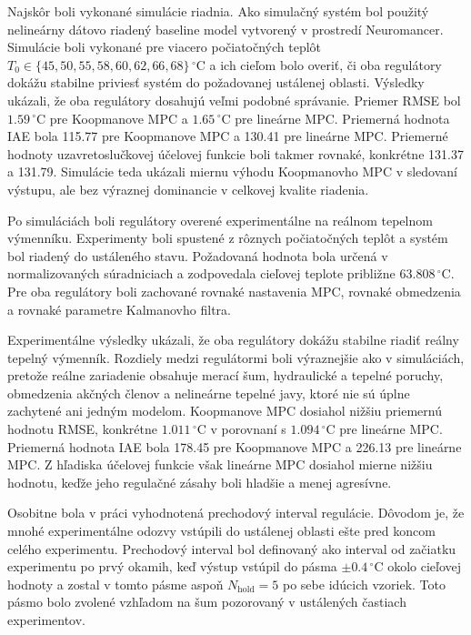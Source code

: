 Najskôr boli vykonané simulácie riadnia. Ako simulačný systém bol použitý nelineárny dátovo riadený baseline model vytvorený v prostredí Neuromancer. Simulácie boli vykonané pre viacero počiatočných teplôt $T_0 \in \{45,50,55,58,60,62,66,68\}\,^\circ\mathrm{C}$ a ich cieľom bolo overiť, či oba regulátory dokážu stabilne priviesť systém do požadovanej ustálenej oblasti. Výsledky ukázali, že oba regulátory dosahujú veľmi podobné správanie. Priemer RMSE bol $1.59\,^\circ\mathrm{C}$ pre Koopmanove MPC a $1.65\,^\circ\mathrm{C}$ pre lineárne MPC. Priemerná hodnota IAE bola 115.77 pre Koopmanove MPC a 130.41 pre lineárne MPC. Priemerné hodnoty uzavretoslučkovej účelovej funkcie boli takmer rovnaké, konkrétne 131.37 a 131.79. Simulácie teda ukázali miernu výhodu Koopmanovho MPC v sledovaní výstupu, ale bez výraznej dominancie v celkovej kvalite riadenia.

Po simuláciách boli regulátory overené experimentálne na reálnom tepelnom výmenníku. Experimenty boli spustené z rôznych počiatočných teplôt a systém bol riadený do ustáleného stavu. Požadovaná hodnota bola určená v normalizovaných súradniciach a zodpovedala cieľovej teplote približne $63.808\,^\circ\mathrm{C}$. Pre oba regulátory boli zachované rovnaké nastavenia MPC, rovnaké obmedzenia a rovnaké parametre Kalmanovho filtra.

Experimentálne výsledky ukázali, že oba regulátory dokážu stabilne riadiť reálny tepelný výmenník. Rozdiely medzi regulátormi boli výraznejšie ako v simuláciách, pretože reálne zariadenie obsahuje merací šum, hydraulické a tepelné poruchy, obmedzenia akčných členov a nelineárne tepelné javy, ktoré nie sú úplne zachytené ani jedným modelom. Koopmanove MPC dosiahol nižšiu priemernú hodnotu RMSE, konkrétne $1.011\,^\circ\mathrm{C}$ v porovnaní s $1.094\,^\circ\mathrm{C}$ pre lineárne MPC. Priemerná hodnota IAE bola 178.45 pre Koopmanove MPC a 226.13 pre lineárne MPC. Z hľadiska účelovej funkcie však lineárne MPC dosiahol mierne nižšiu hodnotu, keďže jeho regulačné zásahy boli hladšie a menej agresívne.

Osobitne bola v práci vyhodnotená prechodový interval regulácie. Dôvodom je, že mnohé experimentálne odozvy vstúpili do ustálenej oblasti ešte pred koncom celého experimentu. Prechodový interval bol definovaný ako interval od začiatku experimentu po prvý okamih, keď výstup vstúpil do pásma $\pm 0.4\,^\circ\mathrm{C}$ okolo cieľovej hodnoty a zostal v tomto pásme aspoň $N_{\mathrm{hold}} = 5$ po sebe idúcich vzoriek. Toto pásmo bolo zvolené vzhľadom na šum pozorovaný v ustálených častiach experimentov.

